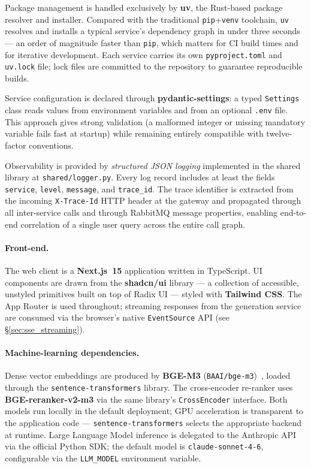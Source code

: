 Package management is handled exclusively by \textbf{uv}, the Rust-based
package resolver and installer.  Compared with the traditional
\texttt{pip}+\texttt{venv} toolchain, \texttt{uv} resolves and installs a
typical service's dependency graph in under three seconds — an order of
magnitude faster than \texttt{pip}, which matters for CI build times and for
iterative development.  Each service carries its own \texttt{pyproject.toml}
and \texttt{uv.lock} file; lock files are committed to the repository to
guarantee reproducible builds.

Service configuration is declared through \textbf{pydantic-settings}: a typed
\texttt{Settings} class reads values from environment variables and from an
optional \texttt{.env} file.  This approach gives strong validation (a
malformed integer or missing mandatory variable fails fast at startup) while
remaining entirely compatible with twelve-factor conventions.

Observability is provided by \emph{structured JSON logging} implemented in the
shared library at \texttt{shared/logger.py}.  Every log record includes at
least the fields \texttt{service}, \texttt{level}, \texttt{message}, and
\texttt{trace\_id}.  The trace identifier is extracted from the incoming
\texttt{X-Trace-Id} HTTP header at the gateway and propagated through all
inter-service calls and through RabbitMQ message properties, enabling
end-to-end correlation of a single user query across the entire call graph.

\paragraph{Front-end.}
The web client is a \textbf{Next.js~15} application written in TypeScript.
UI components are drawn from the \textbf{shadcn/ui} library — a collection of
accessible, unstyled primitives built on top of Radix UI — styled with
\textbf{Tailwind CSS}.  The App Router is used throughout; streaming responses
from the generation service are consumed via the browser's native
\texttt{EventSource} API (see \S\ref{sec:sse_streaming}).

\paragraph{Machine-learning dependencies.}
Dense vector embeddings are produced by \textbf{BGE-M3}
(\texttt{BAAI/bge\allowbreak-m3})~\cite{chen2024bge}, loaded through the
\texttt{sentence-transformers} library.  The cross-encoder re-ranker uses
\textbf{BGE-reranker-v2-m3} via the same library's \texttt{CrossEncoder}
interface.  Both models run locally in the default deployment; GPU
acceleration is transparent to the application code — \texttt{sentence-transformers}
selects the appropriate backend at runtime.  Large Language Model inference is
delegated to the Anthropic API via the official Python SDK; the default model
is \texttt{claude-sonnet-4-6}, configurable via the \texttt{LLM\_MODEL}
environment variable.

